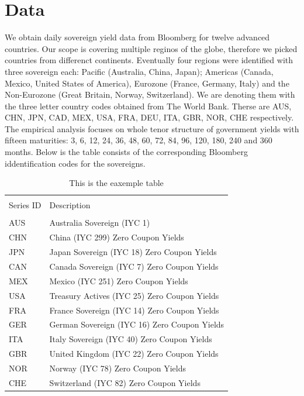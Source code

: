 \documentclass{article}
\begin{document}
\section{Data}
We obtain daily sovereign yield data from Bloomberg for twelve advanced countries. Our scope is covering multiple reginos of the globe, therefore we picked countries from differenct continents. Eventually four regions were identified with three sovereign each: Pacific (Australia, China, Japan); Americas (Canada, Mexico, United States of America), Eurozone (France, Germany, Italy) and the Non-Eurozone (Great Britain, Norway, Switzerland). We are denoting them with the three letter country codes obtained from The World Bank. Therse are AUS, CHN, JPN, CAD, MEX, USA, FRA, DEU, ITA, GBR, NOR, CHE respectively. The empirical analysis focuses on whole tenor structure of government yields with fifteen maturities: 3, 6, 12, 24, 36, 48, 60, 72, 84, 96, 120, 180, 240 and 360 months.
Below is the table consists of the corresponding Bloomberg iddentification codes for the sovereigns.

\begin{table}[ht]
\caption{This is the eaxemple table}%
\fontsize{10}{10}\selectfont
\centering %
\begin{tabular}{l l}%
\hline\hline   \\ [-1.5ex]               %
Series ID & Description\\ [0.5ex] %

\hline       \\ [-1.5ex]           %

AUS	 & Australia Sovereign (IYC 1)	\\
CHN & China (IYC 299)  Zero Coupon Yields	\\
JPN	 & Japan Sovereign (IYC 18) Zero Coupon Yields	\\
CAN & Canada Sovereign (IYC 7) Zero Coupon Yields	\\
MEX	 & Mexico (IYC 251)  Zero Coupon Yields	\\
USA & Treasury Actives (IYC 25) Zero Coupon Yields	\\
FRA	 & France Sovereign (IYC 14) Zero Coupon Yields	\\
GER	 & German Sovereign (IYC 16) Zero Coupon Yields	\\
ITA & Italy Sovereign (IYC 40) Zero Coupon Yields	\\
GBR & United Kingdom (IYC 22) Zero Coupon Yields	\\
NOR & Norway (IYC 78)  Zero Coupon Yields	\\
CHE	 & Switzerland (IYC 82)  Zero Coupon Yields	\\
\hline%
\end{tabular}
\label{table:nonlin}%
\end{table}
\end{document}
